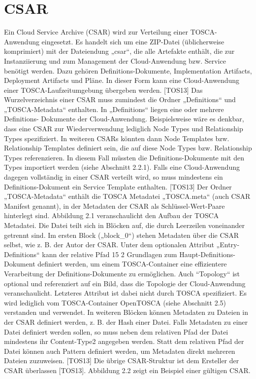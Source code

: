 \section{CSAR}
Ein Cloud Service Archive (CSAR) wird zur Verteilung einer TOSCA-Anwendung
eingesetzt. Es handelt sich um eine ZIP-Datei (üblicherweise komprimiert) mit der
Dateiendung „csar“, die alle Artefakte enthält, die zur Instanziierung und zum
Management der Cloud-Anwendung bzw. Service benötigt werden. Dazu gehören
Definitions-Dokumente, Implementation Artifacts, Deployment Artifacts und Pläne.
In dieser Form kann eine Cloud-Anwendung einer TOSCA-Laufzeitumgebung
übergeben werden. [TOS13]
Das Wurzelverzeichnis einer CSAR muss zumindest die Ordner „Definitions“ und
„TOSCA-Metadata“ enthalten. In „Definitions“ liegen eine oder mehrere Definitions-
Dokumente der Cloud-Anwendung. Beispielsweise wäre es denkbar, dass eine CSAR
zur Wiederverwendung lediglich Node Types und Relationship Types spezifiziert. In
weiteren CSARs könnten dann Node Templates bzw. Relationship Templates definiert
sein, die auf diese Node Types bzw. Relationship Types referenzieren. In diesem
Fall müssten die Definitions-Dokumente mit den Types importiert werden (siehe
Abschnitt 2.2.1). Falls eine Cloud-Anwendung dagegen vollständig in einer CSAR
verteilt wird, so muss mindestens ein Definitions-Dokument ein Service Template
enthalten. [TOS13]
Der Ordner „TOSCA-Metadata“ enthält die TOSCA Metadatei „TOSCA.meta“
(auch CSAR Manifest genannt), in der Metadaten der CSAR als Schlüssel-Wert-Paare
hinterlegt sind. Abbildung 2.1 veranschaulicht den Aufbau der TOSCA Metadatei.
Die Datei teilt sich in Blöcken auf, die durch Leerzeilen voneinander getrennt sind. Im
ersten Block („block_0“) stehen Metadaten über die CSAR selbst, wie z. B. der Autor
der CSAR. Unter dem optionalen Attribut „Entry-Definitions“ kann der relative Pfad
15
2 Grundlagen
zum Haupt-Definitions-Dokument definiert werden, um einem TOSCA-Container eine
effizientere Verarbeitung der Definitions-Dokumente zu ermöglichen. Auch “Topology“
ist optional und referenziert auf ein Bild, dass die Topologie der Cloud-Anwendung
veranschaulicht. Letzteres Attribut ist dabei nicht durch TOSCA spezifiziert. Es wird
lediglich vom TOSCA-Container OpenTOSCA (siehe Abschnitt 2.5) verstanden und
verwendet.
In weiteren Blöcken können Metadaten zu Dateien in der CSAR definiert werden,
z. B. der Hash einer Datei. Falls Metadaten zu einer Datei definiert werden sollen, so
muss neben dem relativen Pfad der Datei mindestens ihr Content-Type2 angegeben
werden. Statt dem relativen Pfad der Datei können auch Pattern definiert werden,
um Metadaten direkt mehreren Dateien zuzuweisen. [TOS13]
Die übrige CSAR-Struktur ist dem Ersteller der CSAR überlassen [TOS13]. Abbildung
2.2 zeigt ein Beispiel einer gültigen CSAR.
